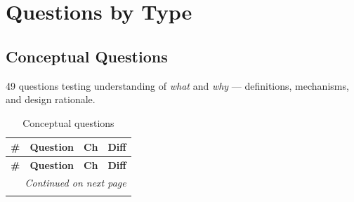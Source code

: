 \section{Questions by Type}
\label{sec:qi_by_type}

\subsection{Conceptual Questions}

49 questions testing understanding of \textit{what} and \textit{why} --- definitions, mechanisms, and design rationale.

\begin{longtable}{rp{8.5cm}ll}
\caption{Conceptual questions} \\
\toprule
\textbf{\#} & \textbf{Question} & \textbf{Ch} & \textbf{Diff} \\
\midrule
\endfirsthead
\toprule
\textbf{\#} & \textbf{Question} & \textbf{Ch} & \textbf{Diff} \\
\midrule
\endhead
\midrule
\multicolumn{4}{r}{\textit{Continued on next page}} \\
\endfoot
\bottomrule
\endlastfoot


\end{longtable}
